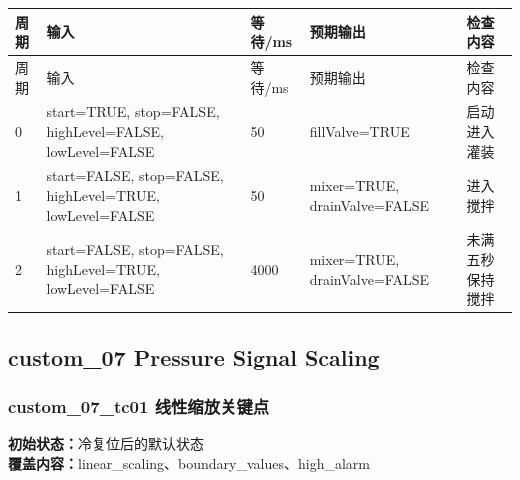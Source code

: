 \begin{longtable}{L{1.0cm}L{4.7cm}L{1.4cm}L{4.0cm}L{2.1cm}}

\toprule

周期 & 输入 & 等待/ms & 预期输出 & 检查内容\\

\midrule

\endfirsthead

\toprule

周期 & 输入 & 等待/ms & 预期输出 & 检查内容\\

\midrule

\endhead

0 & start=TRUE, stop=FALSE, highLevel=FALSE, lowLevel=FALSE & 50 & fillValve=TRUE & 启动进入灌装\\

1 & start=FALSE, stop=FALSE, highLevel=TRUE, lowLevel=FALSE & 50 & mixer=TRUE, drainValve=FALSE & 进入搅拌\\

2 & start=FALSE, stop=FALSE, highLevel=TRUE, lowLevel=FALSE & 4000 & mixer=TRUE, drainValve=FALSE & 未满五秒保持搅拌\\

\bottomrule

\end{longtable}

\subsection{{\ttfamily custom\_07} Pressure Signal Scaling}

\subsubsection{{\ttfamily custom\_07\_tc01} 线性缩放关键点}

\noindent\textbf{初始状态：}冷复位后的默认状态\\

\textbf{覆盖内容：}linear\_scaling、boundary\_values、high\_alarm

